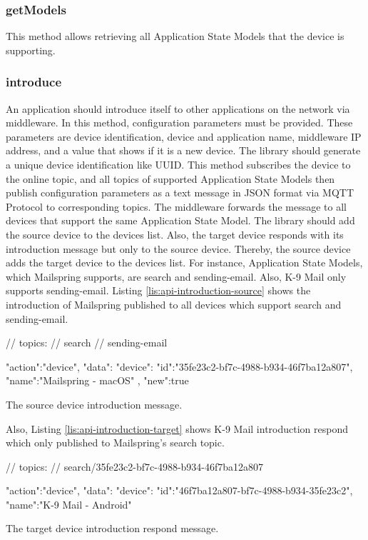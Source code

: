 \subsubsection{getModels}
This method allows retrieving all Application State Models that the device is supporting. 

\subsubsection{introduce}
An application should introduce itself to other applications on the network via middleware. In this method, configuration parameters must be provided. These parameters are device identification, device and application name, middleware IP address, and a value that shows if it is a new device. The library should generate a unique device identification like UUID. This method subscribes the device to the online topic, and all topics of supported Application State Models then publish configuration parameters as a text message in JSON format via MQTT Protocol to corresponding topics. The middleware forwards the message to all devices that support the same Application State Model. The library should add the source device to the devices list. Also, the target device responds with its introduction message but only to the source device. Thereby, the source device adds the target device to the devices list. For instance, Application State Models, which Mailspring supports, are search and sending-email. Also, K-9 Mail only supports sending-email. Listing \ref{lis:api-introduction-source} shows the introduction of Mailspring published to all devices which support search and sending-email. 

\FloatBarrier
\begin{code}
\begin{js2}
// topics:
// search
// sending-email
\end{js2}
\begin{json}
{
   "action":"device",
   "data":{
      "device":{
         "id":"35fe23c2-bf7c-4988-b934-46f7ba12a807",
         "name":"Mailspring - macOS"
      },
      "new":true
   }
}
\end{json}
\caption{The source device introduction message.}
\label{lis:api-introduction-source}
\end{code}
\FloatBarrier


Also, Listing \ref{lis:api-introduction-target} shows K-9 Mail introduction respond which only published to Mailspring's search topic.

\FloatBarrier
\begin{code}
\begin{js2}
// topics:
// search/35fe23c2-bf7c-4988-b934-46f7ba12a807
\end{js2}

\begin{json}
{
   "action":"device",
   "data":{
      "device":{
         "id":"46f7ba12a807-bf7c-4988-b934-35fe23c2",
         "name":"K-9 Mail - Android"
      }
   }
}
\end{json}
\caption{The target device introduction respond message.}
\label{lis:api-introduction-target}
\end{code}
\FloatBarrier


